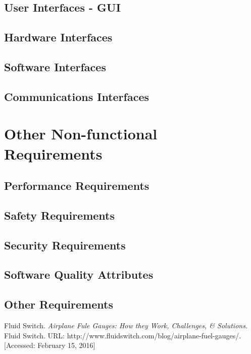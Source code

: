 \documentclass[10pt, a4paper, onecolumn]{scrartcl}
\begin{document}
		\subsection{User Interfaces - GUI}
		
		\subsection{Hardware Interfaces}
		
		\subsection{Software Interfaces}
		
		\subsection{Communications Interfaces}
	
	\section{Other Non-functional Requirements}
	
		\subsection{Performance Requirements}
		
		\subsection{Safety Requirements}
		
		\subsection{Security Requirements}
		
		\subsection{Software Quality Attributes}
		
		\subsection{Other Requirements}
	
	\begin{thebibliography}{99}
		Fluid Switch. \textit{Airplane Fule Gauges: How they Work, Challenges, \& Solutions}. Fluid Switch. URL: http://www.fluidswitch.com/blog/airplane-fuel-gauges/. [Accessed: February 15, 2016]
	\end{thebibliography}
	
	
	
	
	
\end{document}
